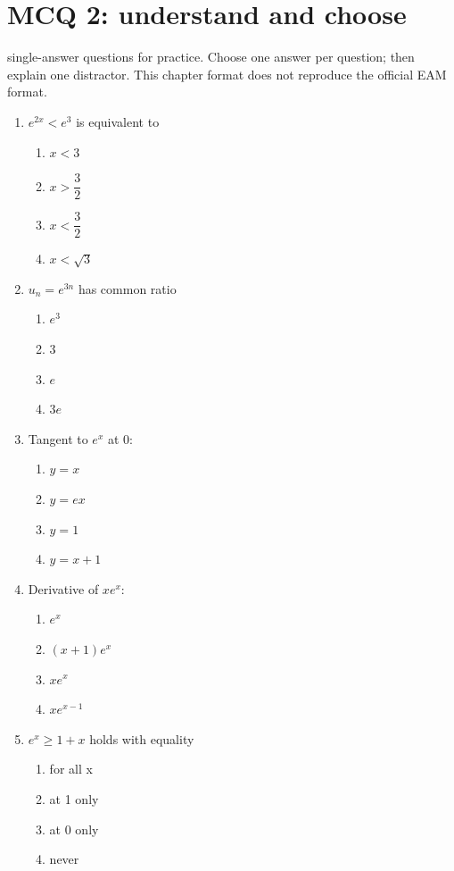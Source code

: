 \endgroup
\begingroup\small
{}\section*{MCQ 2: understand and choose}\label{C09-Q2}
 single-answer questions for practice. Choose one answer per question; then explain one distractor. This chapter format does not reproduce the official EAM format.
\begin{enumerate}
\item $e^{2x}<e^3$ is equivalent to
\begin{enumerate}[label=\Alph*.,itemsep=2pt]
\item $x<3$
\item $x>\dfrac{3}{2}$
\item $x<\dfrac{3}{2}$
\item $x<\sqrt3$
\end{enumerate}
\item $u_n=e^{3n}$ has common ratio
\begin{enumerate}[label=\Alph*.,itemsep=2pt]
\item $e^3$
\item $3$
\item $e$
\item $3e$
\end{enumerate}
\item Tangent to $e^x$ at 0:
\begin{enumerate}[label=\Alph*.,itemsep=2pt]
\item $y=x$
\item $y=e x$
\item $y=1$
\item $y=x+1$
\end{enumerate}
\item Derivative of $xe^x$:
\begin{enumerate}[label=\Alph*.,itemsep=2pt]
\item $e^x$
\item $(x+1)e^x$
\item $xe^x$
\item $xe^{x-1}$
\end{enumerate}
\item $e^x\geq1+x$ holds with equality
\begin{enumerate}[label=\Alph*.,itemsep=2pt]
\item for all x
\item at 1 only
\item at 0 only
\item never
\end{enumerate}
\end{enumerate}

